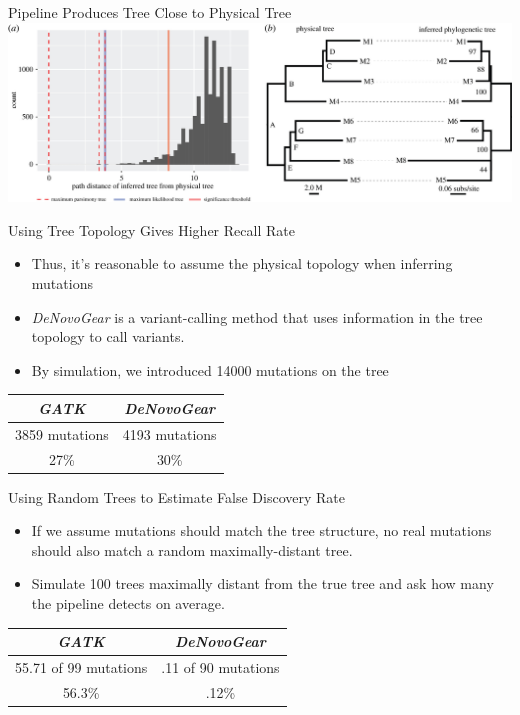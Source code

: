 \documentclass[table]{beamer}
\begin{document}
\begin{frame}{Pipeline Produces Tree Close to Physical Tree}
	\includegraphics[width=\linewidth]{emel_2.jpg}
\end{frame}

\begin{frame}{Using Tree Topology Gives Higher Recall Rate}
	\begin{itemize}
	\item Thus, it's reasonable to assume the physical topology when inferring mutations
	\item \textit{DeNovoGear} is a variant-calling method that uses information in the tree topology to call variants.
	\item By simulation, we introduced 14000 mutations on the tree
	\end{itemize}
	\begin{center}
	\begin{tabular}{ c | c }
	\textit{GATK} & \textit{DeNovoGear} \\
	\hline
	3859 mutations & 4193 mutations \\
	27\% & 30\%
	\end{tabular}
	\end{center}
\end{frame}

\begin{frame}{Using Random Trees to Estimate False Discovery Rate}
\begin{itemize}
	\item If we assume mutations should match the tree structure, no real mutations should also match a random maximally-distant tree.
	\item Simulate 100 trees maximally distant from the true tree and ask how many the pipeline detects on average.
\end{itemize}
\begin{center}
\begin{tabular}{ c | c }
	\textit{GATK} & \textit{DeNovoGear} \\
	\hline
	55.71 of 99 mutations & .11 of 90 mutations \\
	56.3\% & .12\%
\end{tabular}
\end{center}
\end{frame}
\end{document}
